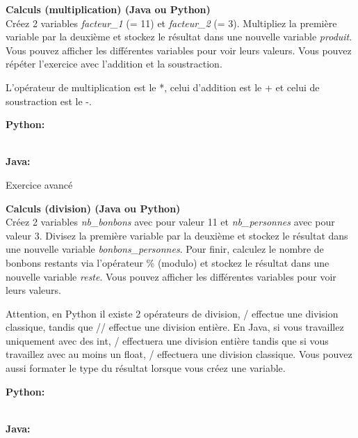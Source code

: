 \begin{Exercice}[3 minutes] \textbf{Calculs (multiplication) (Java ou Python)}\\

   Créez 2 variables \textit{facteur\_1} (= 11) et \textit{facteur\_2} (= 3). Multipliez la première variable par la deuxième et stockez le résultat dans une nouvelle variable \textit{produit}. Vous pouvez afficher les différentes variables pour voir leurs valeurs. Vous pouvez répéter l'exercice avec l'addition et la soustraction. \\
   
    \begin{conseil}
      	L'opérateur de multiplication est le *, celui d'addition est le + et celui de soustraction est le -.
        
    \end{conseil}
    \begin{solution}
    
    \textbf{Python:}
    
    
    \textbf{\\Java:}
    
           
    \end{solution}   
\end{Exercice}

Exercice avancé
\begin{Exercice}[10 minutes] \textbf{Calculs (division) \optionnel (Java ou Python)}\\
   Créez 2 variables \textit{nb\_bonbons} avec pour valeur 11 et \textit{nb\_personnes} avec pour valeur 3. Divisez la première variable par la deuxième et stockez le résultat dans une nouvelle variable \textit{bonbons\_personnes}. Pour finir, calculez le nombre de bonbons restants via l'opérateur \% (modulo) et stockez le résultat dans une nouvelle variable \textit{reste}. Vous pouvez afficher les différentes variables pour voir leurs valeurs. \\
   
    \begin{conseil}
      	Attention, en Python il existe 2 opérateurs de division, / effectue une division classique, tandis que // effectue une division entière. En Java, si vous travaillez uniquement avec des int, / effectuera une division entière tandis que si vous travaillez avec au moins un float, / effectuera une division classique. Vous pouvez aussi formater le type du résultat lorsque vous créez une variable.
        
    \end{conseil}
    \begin{solution}
    
    \textbf{Python:}
    
    
    
    \textbf{\\Java:}
    
           
    \end{solution}   
\end{Exercice}

